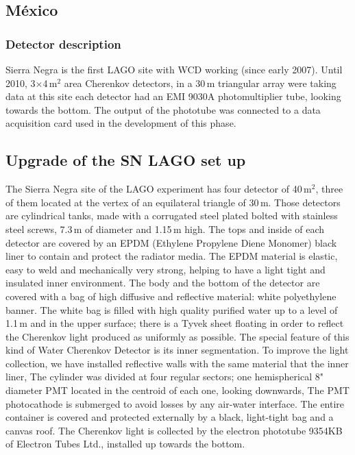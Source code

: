 \subsection{M\'exico}\label{subsec:mex}

\subsubsection*{Detector description}

Sierra Negra is the first LAGO site with WCD working (since early 2007). Until
2010, 3$\times$4\,m$^{2}$ area Cherenkov detectors, in a 30\,m triangular array
were taking data at this site each detector had an EMI 9030A photomultiplier
tube, looking towards the bottom. The output of the phototube was connected to
a data acquisition card used in the development of this phase.

\subsection*{Upgrade of the SN LAGO set up}

The Sierra Negra site of the LAGO experiment has four detector of 40\,m$^{2}$,
three of them located at the vertex of an equilateral triangle of 30\,m. 
Those detectors are cylindrical tanks, made with a corrugated steel plated
bolted with stainless steel screws, 7.3\,m of diameter and 1.15\,m high. The
tops and inside of each detector are covered by an EPDM (Ethylene Propylene
Diene Monomer) black liner to contain and protect the radiator media.
The EPDM material is elastic, easy to weld and mechanically very strong,
helping to have a light tight and insulated inner environment. The body and
the bottom of the detector are covered with a bag of high diffusive and
reflective material: white polyethylene banner. The white bag is filled with
high quality purified water up to a level of 1.1\,m and in the upper surface;
there is a Tyvek sheet floating in order to reflect the Cherenkov light
produced as uniformly as possible. The special feature of this kind of Water
Cherenkov Detector is its inner segmentation. To improve the light collection,
we have installed reflective walls with the same material that the inner liner,
The cylinder was divided at four regular sectors; one hemispherical 8" diameter
PMT located in the centroid of each one, looking downwards, The PMT
photocathode is submerged to avoid losses by any air-water interface. The
entire container is covered and protected externally by a black, light-tight
bag and a canvas roof. The Cherenkov light is collected by the electron
phototube 9354KB of Electron Tubes Ltd., installed up towards the bottom.

